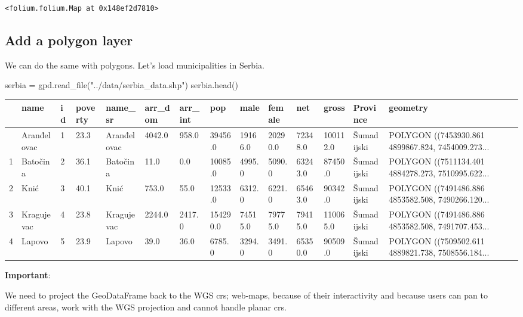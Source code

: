 \documentclass[
  letterpaper,
  DIV=11,
  numbers=noendperiod]{scrreprt}
\newenvironment{Shaded}{\begin{snugshade}}{\end{snugshade}}
\newcommand{\NormalTok}[1]{\textcolor[rgb]{0.00,0.23,0.31}{#1}}
\newcommand{\OperatorTok}[1]{\textcolor[rgb]{0.37,0.37,0.37}{#1}}
\newcommand{\StringTok}[1]{\textcolor[rgb]{0.13,0.47,0.30}{#1}}
\begin{document}
\begin{verbatim}
<folium.folium.Map at 0x148ef2d7810>
\end{verbatim}

\hypertarget{add-a-polygon-layer}{%
\subsection{Add a polygon layer}\label{add-a-polygon-layer}}

We can do the same with polygons. Let's load municipalities in Serbia.

\begin{Shaded}
\begin{Highlighting}[]
\NormalTok{serbia }\OperatorTok{=}\NormalTok{ gpd.read\_file(}\StringTok{"../data/serbia\_data.shp"}\NormalTok{)}
\NormalTok{serbia.head()}
\end{Highlighting}
\end{Shaded}

\begin{longtable}[]{@{}llllllllllllll@{}}
\toprule\noalign{}
& name & id & poverty & name\_sr & arr\_dom & arr\_int & pop & male &
female & net & gross & Province & geometry \\
\midrule\noalign{}
\endhead
\bottomrule\noalign{}
\endlastfoot
0 & Aranđelovac & 1 & 23.3 & Aranđelovac & 4042.0 & 958.0 & 39456.0 &
19166.0 & 20290.0 & 72348.0 & 100112.0 & Šumadijski & POLYGON
((7453930.861 4899867.824, 7454009.273... \\
1 & Batočina & 2 & 36.1 & Batočina & 11.0 & 0.0 & 10085.0 & 4995.0 &
5090.0 & 63243.0 & 87450.0 & Šumadijski & POLYGON ((7511134.401
4884278.273, 7510995.622... \\
2 & Knić & 3 & 40.1 & Knić & 753.0 & 55.0 & 12533.0 & 6312.0 & 6221.0 &
65463.0 & 90342.0 & Šumadijski & POLYGON ((7491486.886 4853582.508,
7490266.120... \\
3 & Kragujevac & 4 & 23.8 & Kragujevac & 2244.0 & 2417.0 & 154290.0 &
74515.0 & 79775.0 & 79415.0 & 110065.0 & Šumadijski & POLYGON
((7491486.886 4853582.508, 7491707.453... \\
4 & Lapovo & 5 & 23.9 & Lapovo & 39.0 & 36.0 & 6785.0 & 3294.0 & 3491.0
& 65350.0 & 90509.0 & Šumadijski & POLYGON ((7509502.611 4889821.738,
7508556.184... \\
\end{longtable}

\textbf{Important}:

We need to project the GeoDataFrame back to the WGS crs; web-maps,
because of their interactivity and because users can pan to different
areas, work with the WGS projection and cannot handle planar crs.
\end{document}
